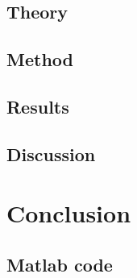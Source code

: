 \documentclass{IEEEtran}
\begin{document}
\subsection{Theory}
\subsection{Method}
\subsection{Results}
\subsection{Discussion}

\section{Conclusion}

\newpage
\begin{appendices}
    \section{Matlab code}
\end{appendices}
\end{document}
